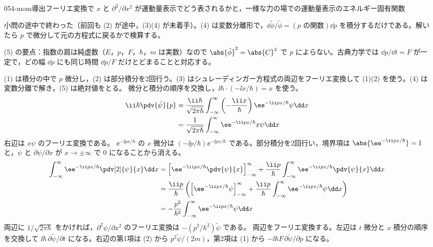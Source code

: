 \documentclass[uplatex,dvipdfmx,a4paper,11pt]{jsarticle}
\begin{document}
\begin{mondai}{054-mom}{導出}{フーリエ変換で $x$ と $\partial^{2}/\partial x^{2}$ が運動量表示でどう表されるかと，一様な力の場での運動量表示のエネルギー固有関数}
\begin{kizuki}
\item {} 小問の途中で終わった（前回も (2) が途中，(3)(4) が未着手）。(4) は変数分離形で，$\dd\tilde{\phi}/\tilde{\phi}=(\text{$p$ の関数})\dd p$ を積分するだけである。解いたら $p$ で微分して元の方程式に戻るかで検算する。
\item (5) の要点：指数の肩は純虚数（$E$，$p$，$F$，$\hbar$，$m$ は実数）なので $\abs{\tilde{\phi}}^{2}=\abs{C}^{2}$ で $p$ によらない。古典力学では $\dd p/\dd t=F$ が一定で，どの幅 $\dd p$ にも同じ時間 $\dd p/F$ だけとどまることと対応する。
\end{kizuki}
\begin{tadashii}
\houshin (1) は積分の中で $p$ 微分し，(2) は部分積分を2回行う。(3) はシュレーディンガー方程式の両辺をフーリエ変換して (1)(2) を使う。(4) は変数分離で解き，(5) は絶対値をとる。
\keisan {} 微分と積分の順序を交換し，$\ii\hbar\cdot(-\ii x/\hbar)=x$ を使う。
\begin{align*}
\ii\hbar\pdv{\tilde{\psi}}{p}
&=\frac{\ii\hbar}{\sqrt{2\pi\hbar}}\int_{-\infty}^{\infty}\left(-\frac{\ii x}{\hbar}\right)\ee^{-\ii px/\hbar}\psi\dd x\\
&=\frac{1}{\sqrt{2\pi\hbar}}\int_{-\infty}^{\infty}\ee^{-\ii px/\hbar}x\psi\dd x
\end{align*}
右辺は $x\psi$ のフーリエ変換である。
 $\ee^{-\ii px/\hbar}$ の $x$ 微分は $(-\ii p/\hbar)\ee^{-\ii px/\hbar}$ である。部分積分を2回行い，境界項は $\abs{\ee^{-\ii px/\hbar}}=1$ と，$\psi$ と $\partial\psi/\partial x$ が $x\to\pm\infty$ で $0$ になることから消える。
\begin{align*}
\int_{-\infty}^{\infty}\ee^{-\ii px/\hbar}\pdv[2]{\psi}{x}\dd x
&=\Bigl[\ee^{-\ii px/\hbar}\pdv{\psi}{x}\Bigr]_{-\infty}^{\infty}+\frac{\ii p}{\hbar}\int_{-\infty}^{\infty}\ee^{-\ii px/\hbar}\pdv{\psi}{x}\dd x\\
&=\frac{\ii p}{\hbar}\left(\Bigl[\ee^{-\ii px/\hbar}\psi\Bigr]_{-\infty}^{\infty}+\frac{\ii p}{\hbar}\int_{-\infty}^{\infty}\ee^{-\ii px/\hbar}\psi\dd x\right)\\
&=-\frac{p^{2}}{\hbar^{2}}\int_{-\infty}^{\infty}\ee^{-\ii px/\hbar}\psi\dd x
\end{align*}
両辺に $1/\sqrt{2\pi\hbar}$ をかければ，$\partial^{2}\psi/\partial x^{2}$ のフーリエ変換は $-(p^{2}/\hbar^{2})\tilde{\psi}$ である。
 両辺をフーリエ変換する。左辺は $t$ 微分と $x$ 積分の順序を交換して $\ii\hbar\,\partial\tilde{\psi}/\partial t$ になる。右辺の第1項は (2) から $p^{2}\tilde{\psi}/(2m)$，第2項は (1) から $-\ii\hbar F\,\partial\tilde{\psi}/\partial p$ になる。

\end{tadashii}
\end{mondai}
\end{document}
